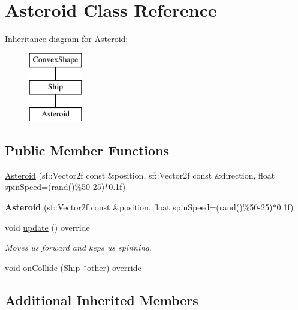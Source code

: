 \hypertarget{class_asteroid}{}\section{Asteroid Class Reference}
\label{class_asteroid}
Inheritance diagram for Asteroid\+:\begin{figure}[H]
\begin{center}
\leavevmode
\includegraphics[height=3.000000cm]{class_asteroid}
\end{center}
\end{figure}
\subsection*{Public Member Functions}
\begin{DoxyCompactItemize}
\item 
\hyperlink{class_asteroid_a478e555c280f7f5726e84273d0094dc0}{Asteroid} (sf\+::\+Vector2f const \&position, sf\+::\+Vector2f const \&direction, float spin\+Speed=(rand()\%50-\/25)$\ast$0.\+1f)
\item 
\hypertarget{class_asteroid_af2371381f0daa45c8cba88c9ee04f0a1}{}{\bfseries Asteroid} (sf\+::\+Vector2f const \&position, float spin\+Speed=(rand()\%50-\/25)$\ast$0.\+1f)\label{class_asteroid_af2371381f0daa45c8cba88c9ee04f0a1}

\item 
\hypertarget{class_asteroid_aabe3a75b05df4749a69469a1204b8382}{}void \hyperlink{class_asteroid_aabe3a75b05df4749a69469a1204b8382}{update} () override\label{class_asteroid_aabe3a75b05df4749a69469a1204b8382}

\begin{DoxyCompactList}\small\item\em Moves us forward and keps us spinning. \end{DoxyCompactList}\item 
void \hyperlink{class_asteroid_a1d13470ee5d53dad7dfcbc7ccc56851a}{on\+Collide} (\hyperlink{class_ship}{Ship} $\ast$other) override
\end{DoxyCompactItemize}
\subsection*{Additional Inherited Members}


